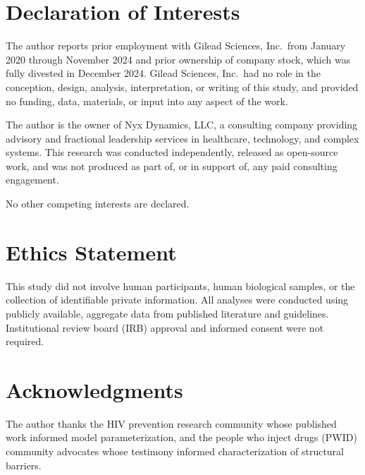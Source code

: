 \documentclass[12pt]{article}
\begin{document}
\section*{Declaration of Interests}

The author reports prior employment with Gilead Sciences, Inc.\ from January 2020 through November 2024 and prior ownership of company stock, which was fully divested in December 2024. Gilead Sciences, Inc.\ had no role in the conception, design, analysis, interpretation, or writing of this study, and provided no funding, data, materials, or input into any aspect of the work.

The author is the owner of Nyx Dynamics, LLC, a consulting company providing advisory and fractional leadership services in healthcare, technology, and complex systems. This research was conducted independently, released as open-source work, and was not produced as part of, or in support of, any paid consulting engagement.

No other competing interests are declared.

\section*{Ethics Statement}

This study did not involve human participants, human biological samples, or the collection of identifiable private information. All analyses were conducted using publicly available, aggregate data from published literature and guidelines. Institutional review board (IRB) approval and informed consent were not required.

\section*{Acknowledgments}

The author thanks the HIV prevention research community whose published work informed model parameterization, and the people who inject drugs (PWID) community advocates whose testimony informed characterization of structural barriers.
\end{document}
